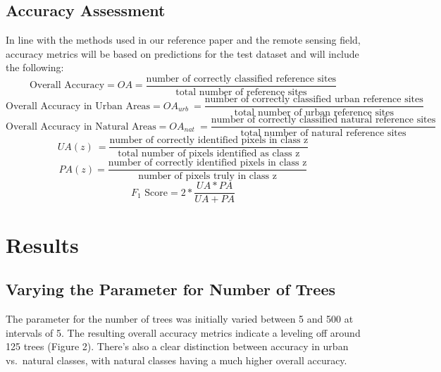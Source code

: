 \documentclass[
]{article}
\begin{document}
\hypertarget{accuracy-assessment}{%
\subsection{Accuracy Assessment}\label{accuracy-assessment}}

In line with the methods used in our reference paper and the remote
sensing field, accuracy metrics will be based on predictions for the
test dataset and will include the following: \[
\text{Overall Accuracy}= OA= \frac{\text{number of correctly classified reference sites}}{\text{total number of reference sites}}
\] \[
\text{Overall Accuracy in Urban Areas} = OA_{urb}\ = \frac{\text{number of correctly classified urban reference sites}}{\text{total number of urban reference sites}}
\] \[
\text{Overall Accuracy in Natural Areas}=OA_{nat}\ = \frac{\text{number of correctly classified natural reference sites}}{\text{total number of natural reference sites}}
\] \[
UA(z)\ = \frac{\text{number of correctly identified pixels in class z}}{\text{total number of pixels identified as class z}}
\] \[
PA(z) = \frac{\text{number of correctly identified pixels in class z}}{\text{number of pixels truly in class z}}
\] \[
F_1\text{ Score} = 2*\frac{UA*PA}{UA+PA}
\]

\hypertarget{results}{%
\section{Results}\label{results}}

\hypertarget{varying-the-parameter-for-number-of-trees}{%
\subsection{Varying the Parameter for Number of
Trees}\label{varying-the-parameter-for-number-of-trees}}

The parameter for the number of trees was initially varied between 5 and
500 at intervals of 5. The resulting overall accuracy metrics indicate a
leveling off around 125 trees (Figure 2). There's also a clear
distinction between accuracy in urban vs.~natural classes, with natural
classes having a much higher overall accuracy.
\end{document}
